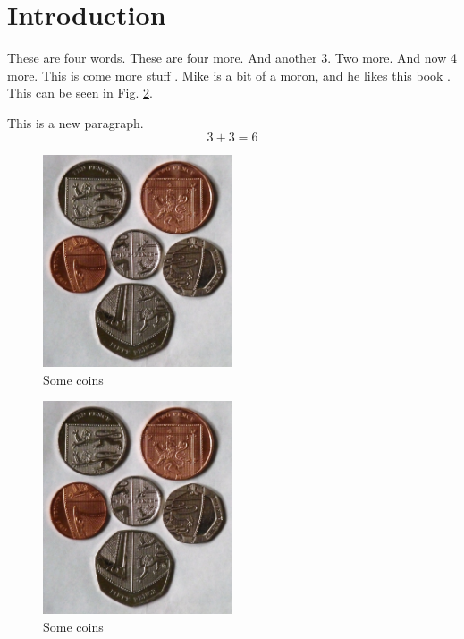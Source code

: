 \documentclass[11pt ,twoside]{article}
\numberwithin{equation}{section}
\begin{document}
\section{Introduction}
\label{seq:Introduction}

These are four words. These are four more. And another 3.  Two more. And now 4 more. This is come more stuff \cite{cycling}. Mike is a bit of a moron, and he likes this book \cite{Mike}. This can be seen in Fig. \ref{fig:coins}.


This is a new paragraph.
\begin{equation}
3 + 3 = 6
\end{equation}


\begin{figure}[htbp]
\begin{center}
\includegraphics[width=0.5\textwidth]{caca.jpg}
\caption{Some coins}
\label{fig:coins}
\end{center}
\end{figure}

\begin{figure}[htbp]
\begin{center}
\includegraphics[width=0.5\textwidth]{caca.jpg}
\caption{Some coins}
\label{fig:coins}
\end{center}
\end{figure}
\end{document}
